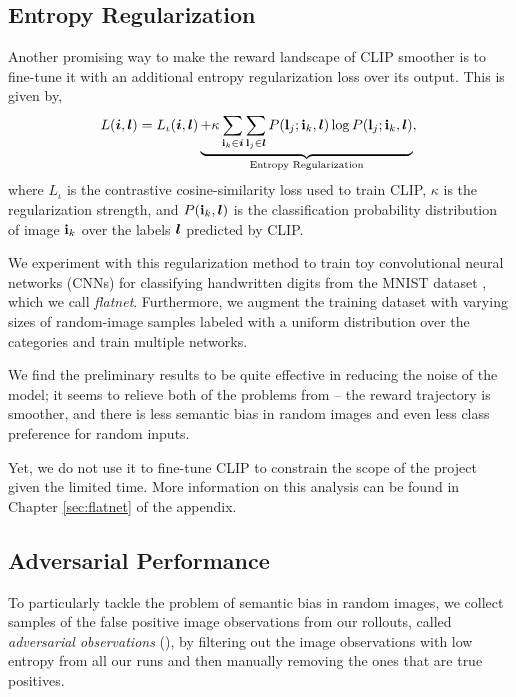 
\subsection{Entropy Regularization}
\label{sec:entropy-regularization}
Another promising way to make the reward landscape of CLIP smoother is to fine-tune it with an additional entropy regularization loss over its output.
This is given by,
\begin{equation}
    \label{eq:entropy-regularization}
    L(\bm{i}, \bm{l}) = L_{\iota}(\bm{i}, \bm{l}) \underbrace{+ \kappa \sum_{\mathbf{i}_k \in \bm{i}}\sum_{\mathbf{l}_j \in \bm{l}} P(\mathbf{l}_j; \mathbf{i}_k, \bm{l}) \log P(\mathbf{l}_j; \mathbf{i}_k, \bm{l})}_{\text{Entropy Regularization}},\\
\end{equation}
where \(L_{\iota}\) is the contrastive cosine-similarity loss used to train CLIP, $\kappa$ is the regularization strength, and \(P(\mathbf{i}_k, \bm{l})\) is the classification probability distribution of image \(\mathbf{i}_k\) over the labels \(\bm{l}\) predicted by CLIP.

We experiment with this regularization method to train toy convolutional neural networks (CNNs) for classifying handwritten digits from the MNIST dataset \citep{mnist}, which we call \emph{flatnet}.
Furthermore, we augment the training dataset with varying sizes of random-image samples labeled with a uniform distribution over the categories and train multiple networks.

We find the preliminary results to be quite effective in reducing the noise of the model; it seems to relieve both of the problems from  -- the reward trajectory is smoother, and there is less semantic bias in random images and even less class preference for random inputs.

Yet, we do not use it to fine-tune CLIP to constrain the scope of the project given the limited time.
More information on this analysis can be found in Chapter \ref{sec:flatnet} of the appendix.

\subsection{Adversarial Performance}
\label{sec:adversarial-performance}
To particularly tackle the problem of semantic bias in random images, we collect samples of the false positive image observations from our rollouts, called \emph{adversarial observations} (), by filtering out the image observations with low entropy from all our runs and then manually removing the ones that are true positives.


